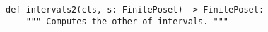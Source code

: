 \begin{verbatim}
def intervals2(cls, s: FinitePoset) -> FinitePoset:
    """ Computes the other of intervals. """
\end{verbatim}